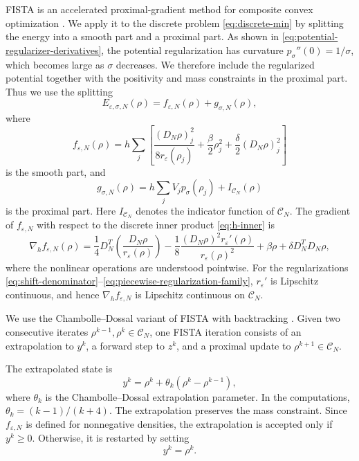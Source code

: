 \documentclass[11pt]{article}
\newcommand{\CN}{\mathcal{C}_N}
\newcommand{\eps}{\varepsilon}
\newcommand{\sig}{\sigma}
\theoremstyle{plain}
\theoremstyle{definition}
\numberwithin{equation}{section}
\begin{document}
FISTA is an accelerated proximal-gradient method for composite convex
optimization \cite{BeckTeboulle2009}. We apply it to the discrete
problem \eqref{eq:discrete-min} by splitting the energy into a smooth part and a proximal
part.
As shown in  \eqref{eq:potential-regularizer-derivatives}, the potential regularization has curvature $p_\sig''(0)=1/\sig$, which
becomes large as $\sig$ decreases. 
We therefore include the regularized
potential together with the positivity and mass constraints in the
proximal part. Thus we use the splitting
\begin{equation}
\label{eq:f-plus-g}
E_{\eps,\sig,N}(\rho)
=
f_{\eps,N}(\rho)+g_{\sig,N}(\rho),
\end{equation}
where
\begin{equation}
\label{eq:smooth-part}
f_{\eps,N}(\rho)
=
h\sum_j
\left[
\frac{(D_N\rho)_j^2}{8r_\eps(\rho_j)}
+\frac{\beta}{2}\rho_j^2
+\frac{\delta}{2}(D_N\rho)_j^2
\right]
\end{equation}
is the smooth part, and
\begin{equation}
\label{eq:prox-part}
g_{\sig,N}(\rho)
=
h\sum_j V_jp_\sig(\rho_j)
+
I_{\CN}(\rho)
\end{equation}
is the proximal part. Here $I_{\CN}$ denotes the indicator function
of $\CN$.
The gradient of $f_{\eps,N}$ with respect to the discrete inner
product \eqref{eq:h-inner} is
\begin{equation}
\label{eq:smooth-gradient}
\nabla_h f_{\eps,N}(\rho)
=
\frac14D_N^T
\left(
\frac{D_N\rho}{r_\eps(\rho)}
\right)
-\frac18
\frac{(D_N\rho)^2r_\eps'(\rho)}
     {r_\eps(\rho)^2}
+\beta\rho
+\delta D_N^TD_N\rho,
\end{equation}
where the nonlinear operations are understood pointwise. 
For the regularizations  \eqref{eq:shift-denominator}--\eqref{eq:piecewise-regularization-family}, \(r_\eps'\) is Lipschitz continuous, and hence \(\nabla_h f_{\eps,N}\) is Lipschitz continuous on \(\mathcal C_N\). 

We use the Chambolle--Dossal variant of FISTA with backtracking
\cite{BeckTeboulle2009, ChambolleDossal2015}.
Given two consecutive iterates $\rho^{k-1},\rho^k\in\CN$, one FISTA
iteration consists of an extrapolation to $y^k$, a forward step to
$z^k$, and a proximal update to $\rho^{k+1}\in\CN$.

The extrapolated state is
\begin{equation}
\label{eq:fista-extrapolation}
y^k
=
\rho^k+\theta_k(\rho^k-\rho^{k-1}),
\end{equation}
where $\theta_k$ is the Chambolle--Dossal extrapolation parameter.
In the computations,
\(
\theta_k=(k-1)/(k+4).
\)
The extrapolation preserves the mass constraint. Since
$f_{\eps,N}$ is defined for nonnegative densities, the extrapolation
is accepted only if $y^k\ge0$. Otherwise, it is restarted by setting
\[
y^k=\rho^k.
\]
\end{document}

